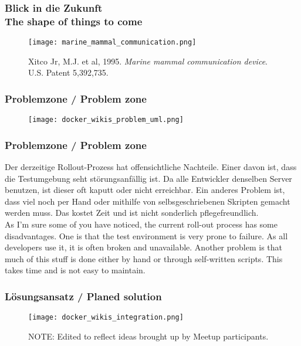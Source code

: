\begin{frame}
  \frametitle{Blick in die Zukunft \\ \textcolor{mfn_green}{The shape of things to come}}
  \begin{figure}
    \texttt{[image: marine\_mammal\_communication.png]}
    \caption{Xitco Jr, M.J. et al, 1995. \textit{Marine mammal communication device}. U.S. Patent 5,392,735.}
  \end{figure}
\end{frame}

\begin{frame}
  \frametitle{Problemzone / \textcolor{mfn_green}{Problem zone}}
  \begin{figure}
    \texttt{[image: docker\_wikis\_problem\_uml.png]}
  \end{figure}
\end{frame}

{\scriptsize
\begin{frame}
  \frametitle{Problemzone / \textcolor{mfn_green}{Problem zone}}
  Der derzeitige Rollout-Prozess hat offensichtliche Nachteile. Einer davon ist, dass die Testumgebung seht störungsanfällig ist. Da alle Entwickler denselben Server benutzen, ist dieser oft kaputt oder nicht erreichbar. Ein anderes Problem ist, dass viel noch per Hand oder mithilfe von selbsgeschriebenen Skripten gemacht werden muss. Das kostet Zeit und ist nicht sonderlich pflegefreundlich.\\
  \bigskip
  \textcolor{mfn_green}{As I'm sure some of you have noticed, the current roll-out process has some disadvantages. One is that the test environment is very prone to failure. As all developers use it, it is often broken and unavailable. Another problem is that much of this stuff is done either by hand or through self-written scripts. This takes time and is not easy to maintain.}
\end{frame}
}
\begin{frame}
  \frametitle{Lösungsansatz / \textcolor{mfn_green}{Planed solution}}
  \begin{figure}
    \texttt{[image: docker\_wikis\_integration.png]}
    \caption{\textcolor{mfn_blue}{NOTE: Edited to reflect ideas brought up by Meetup participants.}}
  \end{figure}
\end{frame}

